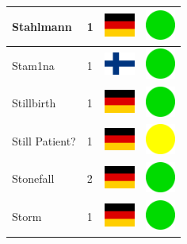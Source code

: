 \documentclass[12pt, a4paper, twoside]{report}
\begin{document}
\begin{center}
\begin{longtable}{|p{5cm}|p{2cm}|p{2cm}|p{2cm}|}
			Stahlmann & 1 & \includegraphics[width=1cm]{4x3/de} & \includegraphics[width=1cm]{likes/y} \\ \hline
			Stam1na & 1 & \includegraphics[width=1cm]{4x3/fi} & \includegraphics[width=1cm]{likes/y} \\ \hline
			Stillbirth & 1 & \includegraphics[width=1cm]{4x3/de} & \includegraphics[width=1cm]{likes/y} \\ \hline
			Still Patient? & 1 & \includegraphics[width=1cm]{4x3/de} & \includegraphics[width=1cm]{likes/m} \\ \hline
			Stonefall & 2 & \includegraphics[width=1cm]{4x3/de} & \includegraphics[width=1cm]{likes/y} \\ \hline
			Storm & 1 & \includegraphics[width=1cm]{4x3/de} & \includegraphics[width=1cm]{likes/y} \\ \hline

\end{longtable}
\end{center}
\end{document}

